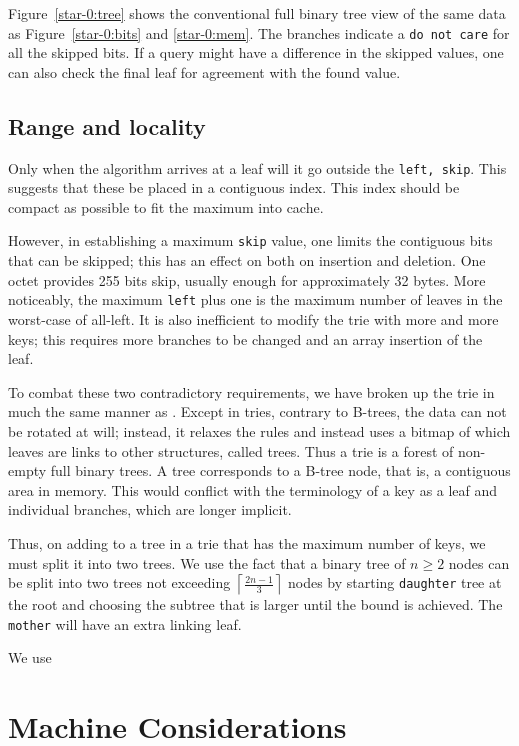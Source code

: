\documentclass[12pt]{article}
\newcommand{\code}[1]{\colorbox{light-gray}{\texttt{#1}}}
\begin{document}
Figure~\ref{star-0:tree} shows the conventional full binary tree view of the same data as Figure~\ref{star-0:bits} and \ref{star-0:mem}. The branches indicate a \code{do not care} for all the skipped bits. If a query might have a difference in the skipped values, one can also check the final leaf for agreement with the found value.

\subsection{Range and locality}

Only when the algorithm arrives at a leaf will it go outside the \code{left, skip}. This suggests that these be placed in a contiguous index. This index should be compact as possible to fit the maximum into cache.

However, in establishing a maximum \code{skip} value, one limits the contiguous bits that can be skipped; this has an effect on both on insertion and deletion. One octet provides 255 bits skip, usually enough for approximately 32 bytes. More noticeably, the maximum \code{left} plus one is the maximum number of leaves in the worst-case of all-left. It is also inefficient to modify the trie with more and more keys; this requires more branches to be changed and an array insertion of the leaf.

To combat these two contradictory requirements, we have broken up the trie in much the same manner as \cite{bayer1972organization}. Except in tries, contrary to B-trees, the data can not be rotated at will; instead, it relaxes the rules and instead uses a bitmap of which leaves are links to other structures, called trees. Thus a trie is a forest of non-empty full binary trees. A tree corresponds to a B-tree node\cite{knuth1997sorting}, that is, a contiguous area in memory. This would conflict with the terminology of a key as a leaf and individual branches, which are longer implicit.

Thus, on adding to a tree in a trie that has the maximum number of keys, we must split it into two trees. We use the fact that a binary tree of $n \ge 2$ nodes can be split into two trees not exceeding $\left\lceil \frac{2n-1}{3} \right\rceil$ nodes by starting \code{daughter} tree at the root and choosing the subtree that is larger until the bound is achieved. The \code{mother} will have an extra linking leaf.

We use

\section{Machine Considerations}
\end{document}
